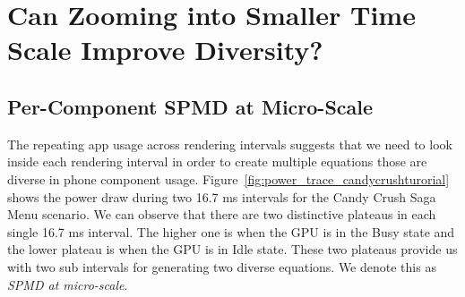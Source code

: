 \section{Can Zooming into Smaller Time Scale Improve Diversity?}

\subsection{Per-Component SPMD at Micro-Scale}
\label{sec:modelling_micro}


The repeating app usage across rendering intervals suggests that
we need to look inside each rendering interval in order to create multiple equations those
are diverse in phone component usage. 
Figure~\ref{fig:power_trace_candycrushturorial} shows the power draw during 
two 16.7 ms intervals for the Candy Crush Saga Menu scenario.
We can observe that there are two distinctive plateaus in each single 16.7 ms interval.
The higher one is when the GPU is in the Busy state and
the lower plateau is when the GPU is in Idle state. 
These two plateaus provide us with two sub intervals for generating two diverse equations.
We denote this as {\it SPMD at micro-scale}.

